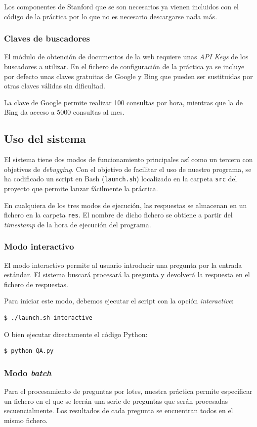 \documentclass[12pt,a4paper,titlepage]{article}
\begin{document}
Los componentes de Stanford que se son necesarios ya vienen incluidos con el código de la práctica por lo que no es necesario descargarse nada más.

\subsubsection{Claves de buscadores}
El módulo de obtención de documentos de la web requiere unas \emph{API Keys} de los buscadores a utilizar. En el fichero de configuración de la práctica ya se incluye por defecto unas claves gratuitas de Google y Bing que pueden ser sustituidas por otras claves válidas sin dificultad.

La clave de Google permite realizar 100 consultas por hora, mientras que la de Bing da acceso a 5000 consultas al mes.


\subsection{Uso del sistema}
El sistema tiene dos modos de funcionamiento principales así como un tercero con objetivos de \emph{debugging}. Con el objetivo de facilitar el uso de nuestro programa, se ha codificado un script en Bash (\texttt{launch.sh}) localizado en la carpeta \texttt{src} del proyecto que permite lanzar fácilmente la práctica.

En cualquiera de los tres modos de ejecución, las respuestas se almacenan en un fichero en la carpeta \texttt{res}. El nombre de dicho fichero se obtiene a partir del \emph{timestamp} de la hora de ejecución del programa.

\subsubsection{Modo interactivo}
El modo interactivo permite al usuario introducir una pregunta por la entrada estándar. El sistema buscará procesará la pregunta y devolverá la respuesta en el fichero de respuestas.

Para iniciar este modo, debemos ejecutar el script con la opción \emph{interactive}:
\begin{lstlisting}
$ ./launch.sh interactive
\end{lstlisting}

O bien ejecutar directamente el código Python:
\begin{lstlisting}
$ python QA.py
\end{lstlisting}

\subsubsection{Modo \emph{batch}}
Para el procesamiento de preguntas por lotes, nuestra práctica permite especificar un fichero en el que se leerán una serie de preguntas que serán procesadas secuencialmente. Los resultados de cada pregunta se encuentran todos en el mismo fichero.
\end{document}
